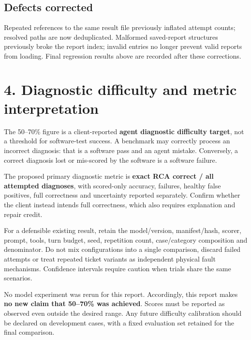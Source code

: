 \documentclass[10pt,a4paper]{article}
\begin{document}
\subsection*{Defects corrected}
Repeated references to the same result file previously inflated attempt counts; resolved paths are now deduplicated. Malformed saved-report structures previously broke the report index; invalid entries no longer prevent valid reports from loading. Final regression results above are recorded after these corrections.

\newpage
\section*{4. Diagnostic difficulty and metric interpretation}
The 50--70\% figure is a client-reported \textbf{agent diagnostic difficulty target}, not a threshold for software-test success. A benchmark may correctly process an incorrect diagnosis: that is a software pass and an agent mistake. Conversely, a correct diagnosis lost or mis-scored by the software is a software failure.

The proposed primary diagnostic metric is \textbf{exact RCA correct / all attempted diagnoses}, with scored-only accuracy, failures, healthy false positives, full correctness and uncertainty reported separately. Confirm whether the client instead intends full correctness, which also requires explanation and repair credit.

For a defensible existing result, retain the model/version, manifest/hash, scorer, prompt, tools, turn budget, seed, repetition count, case/category composition and denominator. Do not mix configurations into a single comparison, discard failed attempts or treat repeated ticket variants as independent physical fault mechanisms. Confidence intervals require caution when trials share the same scenarios.

No model experiment was rerun for this report. Accordingly, this report makes \textbf{no new claim that 50--70\% was achieved}. Scores must be reported as observed even outside the desired range. Any future difficulty calibration should be declared on development cases, with a fixed evaluation set retained for the final comparison.
\end{document}
